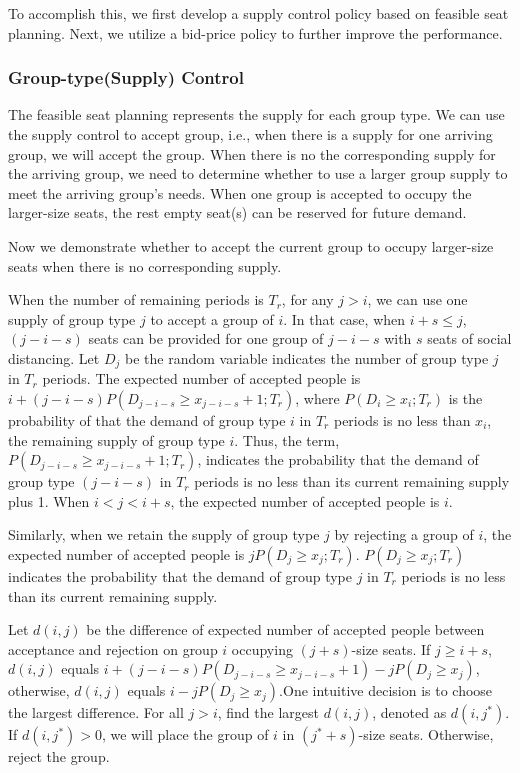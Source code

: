 To accomplish this, we first develop a supply control policy based on feasible seat planning. Next, we utilize a bid-price policy to further improve the performance.


\subsubsection{Group-type(Supply) Control}\label{nested_policy}
The feasible seat planning represents the supply for each group type. We can use the supply control to accept group, i.e., when there is a supply for one arriving group, we will accept the group. When there is no the corresponding supply for the arriving group, we need to determine whether to use a larger group supply to meet the arriving group's needs. When one group is accepted to occupy the larger-size seats, the rest empty seat(s) can be reserved for future demand.

Now we demonstrate whether to accept the current group to occupy larger-size seats when there is no corresponding supply. 

When the number of remaining periods is $T_r$, for any $j>i$, we can use one supply of group type $j$ to accept a group of $i$. In that case, when $i+s \leq j$, $(j-i-s)$ seats can be provided for one group of $j-i-s$ with $s$ seats of social distancing. Let $D_j$ be the random variable indicates the number of group type $j$ in $T_r$ periods. The expected number of accepted people is $i + (j-i-s)P(D_{j-i-s} \geq x_{j-i-s}+1; T_r)$, where $P(D_i \geq x_i; T_r)$ is the probability of that the demand of group type $i$ in $T_r$ periods is no less than $x_i$, the remaining supply of group type $i$. Thus, the term, $P(D_{j-i-s} \geq x_{j-i-s}+1; T_r)$, indicates the probability that the demand of group type $(j-i-s)$ in $T_r$ periods is no less than its current remaining supply plus 1. When $i <j < i+s$, the expected number of accepted people is $i$.

Similarly, when we retain the supply of group type $j$ by rejecting a group of $i$, the expected number of accepted people is $j P(D_{j} \geq x_{j}; T_r)$. $P(D_{j} \geq x_{j}; T_r)$ indicates the probability that the demand of group type $j$ in $T_r$ periods is no less than its current remaining supply.

Let $d(i,j)$ be the difference of expected number of accepted people between acceptance and rejection on group $i$ occupying $(j+s)$-size seats. If $j \geq i+s$, $d(i,j)$ equals $i + (j-i-s)P(D_{j-i-s} \geq x_{j-i-s}+1) - j P(D_{j} \geq x_{j})$, otherwise, $d(i,j)$ equals $i - j P(D_{j} \geq x_{j})$.One intuitive decision is to choose the largest difference. For all $j >i$, find the largest $d(i,j)$, denoted as $d(i,j^{*})$. If $d(i,j^{*}) >0$, we will place the group of $i$ in $(j^{*}+s)$-size seats. Otherwise, reject the group.

